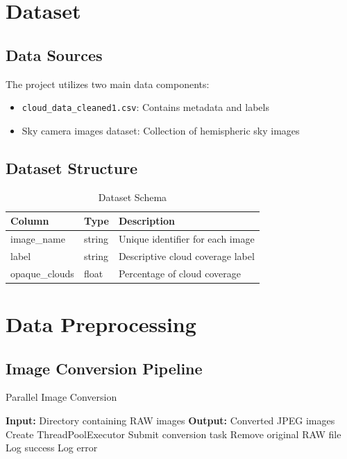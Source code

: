 \documentclass[11pt,a4paper]{article}
\begin{document}
\section{Dataset}
\subsection{Data Sources}
The project utilizes two main data components:
\begin{itemize}
    \item \texttt{cloud\_data\_cleaned1.csv}: Contains metadata and labels
    \item Sky camera images dataset: Collection of hemispheric sky images
\end{itemize}

\subsection{Dataset Structure}
\begin{table}[H]
\centering
\begin{tabular}{@{}lll@{}}
\toprule
Column & Type & Description \\
\midrule
image\_name & string & Unique identifier for each image \\
label & string & Descriptive cloud coverage label \\
opaque\_clouds & float & Percentage of cloud coverage \\
\bottomrule
\end{tabular}
\caption{Dataset Schema}
\end{table}

\section{Data Preprocessing}
\subsection{Image Conversion Pipeline}
\begin{algorithm}[H]
\caption{Parallel Image Conversion}
\begin{algorithmic}[1]
\State \textbf{Input:} Directory containing RAW images
\State \textbf{Output:} Converted JPEG images
    \State Create ThreadPoolExecutor
    \State Submit conversion task
        \State Remove original RAW file
        \State Log success
    \Else
        \State Log error
    \EndIf
\EndFor
\end{algorithmic}
\end{algorithm}
\end{document}
